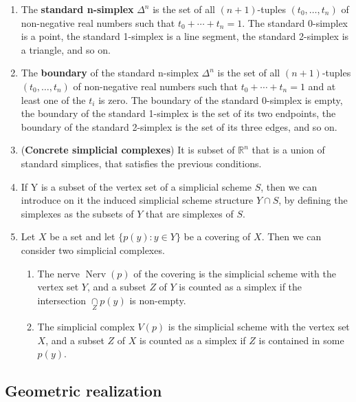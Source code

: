 \begin{example}
    \begin{enumerate}
        \item The \textbf{standard n-simplex} $\Delta^n$ is the set of all $(n+1)$-tuples $(t_0, \ldots, t_n)$ of non-negative real numbers such that $t_0 + \cdots + t_n = 1$. The standard 0-simplex is a point, the standard 1-simplex is a line segment, the standard 2-simplex is a triangle, and so on.

        \item The \textbf{boundary} of the standard n-simplex $\Delta^n$ is the set of all $(n+1)$-tuples $(t_0, \ldots, t_n)$ of non-negative real numbers such that $t_0 + \cdots + t_n = 1$ and at least one of the $t_i$ is zero. The boundary of the standard 0-simplex is empty, the boundary of the standard 1-simplex is the set of its two endpoints, the boundary of the standard 2-simplex is the set of its three edges, and so on.

        \item (\textbf{Concrete simplicial complexes}) It is subset of $\mathbb{R}^n$ that is a union of standard simplices, that satisfies the previous conditions.

        \item If Y is a subset of the vertex set of a simplicial scheme $S$, then we can introduce on it the induced simplicial scheme structure $ Y \cap S$, by defining the simplexes as the subsets of $ Y $ that are simplexes of $S$.  

        \item Let $X$ be a set and let $\{p(y): y \in Y\}$ be a covering of $X$. Then we can consider two simplicial complexes. 
        \begin{enumerate}
            \item The nerve $\operatorname{Nerv}(p)$ of the covering is the simplicial scheme with the vertex set $Y$, and a subset $Z$ of $Y$ is counted as a simplex if the intersection $\underset{Z}{\cap} p(y)$ is non-empty. 
            \item The simplicial complex $V(p)$ is the simplicial scheme with the vertex set $X$, and a subset $Z$ of $X$ is counted as a simplex if $Z$ is contained in some $p(y)$.
        \end{enumerate}
    \end{enumerate}
\end{example}

\subsection*{Geometric realization}

